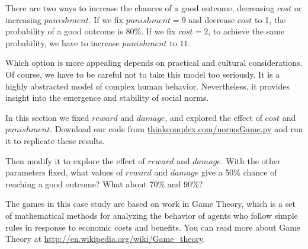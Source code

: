 \documentclass[10pt]{book}
\begin{document}

There are two ways to increase the chances of a good outcome,
decreasing $cost$ or increasing $punishment$.  If we fix
$punishment=9$ and decrease $cost$ to 1, the probability of a good
outcome is 80\%.  If we fix $cost=2$, to achieve the same probability,
we have to increase $punishment$ to $11$.

Which option is more appealing depends on practical and cultural
considerations.  Of course, we have to be careful not to take this
model too seriously.  It is a highly abstracted model of complex human
behavior.  Nevertheless, it provides insight into the emergence
and stability of social norms.

\begin{exercise}

In this section we fixed $reward$ and $damage$, and explored the
effect of $cost$ and $punishment$.
Download our code from \url{thinkcomplex.com/normsGame.py} and
run it to replicate these results.

Then modify it to explore the effect of $reward$ and $damage$.  With
the other parameters fixed, what values of $reward$ and $damage$ give
a 50\% chance of reaching a good outcome?  What about 70\% and 90\%?
\end{exercise}

\begin{exercise}

The games in this case study are based on work in
Game Theory, which is a set of mathematical methods for analyzing the
behavior of agents who follow simple rules in response to economic
costs and benefits.  You can read more about Game Theory at
\url{http://en.wikipedia.org/wiki/Game_theory}.
\end{exercise}



\printindex

\clearemptydoublepage

\end{document}
